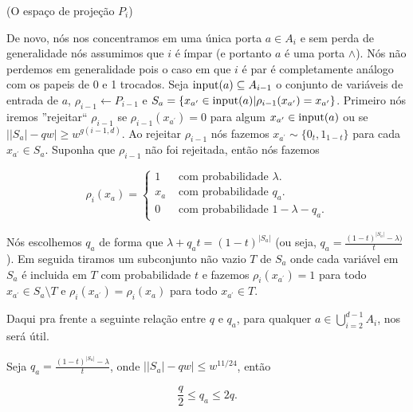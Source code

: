 \begin{defi} (O espaço de projeção $P_{i}$) \label{defi_Pi}

De novo, nós nos concentramos em uma única porta $a \in A_{i}$ e sem perda de generalidade nós assumimos que $i$ é ímpar (e portanto $a$ é uma porta $\land$). Nós não perdemos em generalidade pois o caso em que $i$ é par é completamente análogo com os papeis de 0 e 1 trocados. Seja $\text{input}(a) \subseteq A_{i - 1}$ o conjunto de variáveis de entrada de $a$, $\rho_{i - 1} \leftarrow P_{i - 1}$ e $S_{a} = \{x_{a^{\prime}} \in \text{input}(a) \lvert \rho_{i - 1}(x_{a^{\prime}}) = x_{a^{\prime}}\}$. Primeiro nós iremos ''rejeitar`` $\rho_{i - 1}$ se $\rho_{i - 1}(x_{a^{\prime}}) = 0$ para algum $x_{a^{\prime}} \in \text{input}(a)$ ou se $\big\lvert \lvert S_{a} \rvert - qw \big\rvert \geq w^{g(i - 1, d)}$. Ao rejeitar $\rho_{i - 1}$ nós fazemos $x_{a^{\prime}} \sim \{0_{t}, 1_{1 - t}\}$ para cada $x_{a^{\prime}} \in S_{a}$. Suponha que $\rho_{i - 1}$ não foi rejeitada, então nós fazemos

\begin{equation*}
	\rho_{i}(x_{a}) = \begin{cases}
			        	  1 & \text{ com probabilidade } \lambda. \\
			        	  x_{a} & \text{ com probabilidade } q_{a}. \\
			        	  0 & \text{ com probabilidade } 1 - \lambda - q_{a}.
			        \end{cases}
\end{equation*}

Nós escolhemos $q_{a}$ de forma que $\lambda + q_{a}t = (1 -t)^{\lvert S_{a} \rvert}$ (ou seja, $q_{a} = \frac{(1 - t)^{\lvert S_{a} \rvert} - \lambda)}{t}$). Em seguida tiramos um subconjunto não vazio $T$ de $S_{a}$ onde cada variável em $S_{a}$ é incluida em $T$ com probabilidade $t$ e fazemos $\rho_{i}(x_{a^{\prime}}) = 1$ para todo $x_{a^{\prime}} \in S_{a} \setminus T$ e $\rho_{i}(x_{a^{\prime}}) = \rho_{i}(x_{a})$ para todo $x_{a^{\prime}} \in T$.

\end{defi}

Daqui pra frente a seguinte relação entre $q$ e $q_{a}$, para qualquer $a \in \bigcup_{i = 2}^{d - 1}A_{i}$, nos será útil.

\begin{prop} \label{q_qa}

Seja $q_{a} = \frac{(1 - t)^{\lvert S_{a} \rvert} - \lambda}{t}$, onde $\big\lvert \lvert S_{a} \rvert - qw \big\rvert \leq w^{11/24}$, então

\begin{equation*}
	\frac{q}{2} \leq q_{a} \leq 2q.
\end{equation*}

\end{prop}

